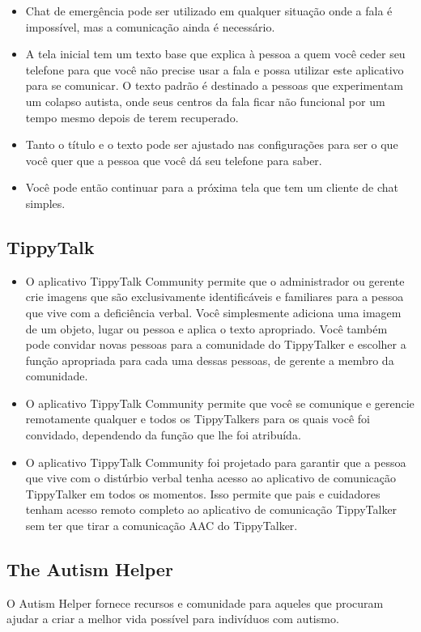 \begin{itemize}
    \item Chat de emergência pode ser utilizado em qualquer situação onde a fala é impossível, mas a comunicação ainda é necessário.
    \item A tela inicial tem um texto base que explica à pessoa a quem você ceder seu telefone para que você não precise usar a fala e possa utilizar este aplicativo para se comunicar. O texto padrão é destinado a pessoas que experimentam um colapso autista, onde seus centros da fala ficar não funcional por um tempo mesmo depois de terem recuperado.
    \item Tanto o título e o texto pode ser ajustado nas configurações para ser o que você quer que a pessoa que você dá seu telefone para saber.
    \item Você pode então continuar para a próxima tela que tem um cliente de chat simples.
\end{itemize}

\subsection{TippyTalk}

\begin{itemize}
    \item O aplicativo TippyTalk Community permite que o administrador ou gerente crie imagens que são exclusivamente identificáveis e familiares para a pessoa que vive com a deficiência verbal. Você simplesmente adiciona uma imagem de um objeto, lugar ou pessoa e aplica o texto apropriado. Você também pode convidar novas pessoas para a comunidade do TippyTalker e escolher a função apropriada para cada uma dessas pessoas, de gerente a membro da comunidade.
    \item O aplicativo TippyTalk Community permite que você se comunique e gerencie remotamente qualquer e todos os TippyTalkers para os quais você foi convidado, dependendo da função que lhe foi atribuída.
     \item O aplicativo TippyTalk Community foi projetado para garantir que a pessoa que vive com o distúrbio verbal tenha acesso ao aplicativo de comunicação TippyTalker em todos os momentos. Isso permite que pais e cuidadores tenham acesso remoto completo ao aplicativo de comunicação TippyTalker sem ter que tirar a comunicação AAC do TippyTalker.
\end{itemize}

\subsection{The Autism Helper}
O Autism Helper fornece recursos e comunidade para aqueles que procuram ajudar a criar a melhor vida possível para indivíduos com autismo.

